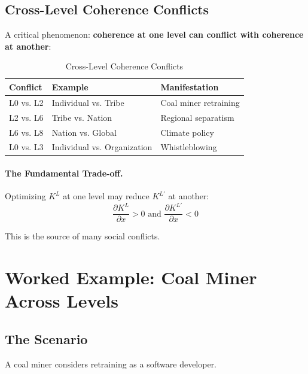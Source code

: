 \subsection{Cross-Level Coherence Conflicts}

A critical phenomenon: \textbf{coherence at one level can conflict with coherence at another}:

\begin{table}[htbp]
\centering
\caption{Cross-Level Coherence Conflicts}
\label{tab:aaa-conflicts}
\renewcommand{\arraystretch}{1.3}
\begin{tabular}{@{}lll@{}}
\toprule
\textbf{Conflict} & \textbf{Example} & \textbf{Manifestation} \\
\midrule
L0 vs. L2 & Individual vs. Tribe & Coal miner retraining \\
L2 vs. L6 & Tribe vs. Nation & Regional separatism \\
L6 vs. L8 & Nation vs. Global & Climate policy \\
L0 vs. L3 & Individual vs. Organization & Whistleblowing \\
\bottomrule
\end{tabular}
\end{table}

\paragraph{The Fundamental Trade-off.}
Optimizing $K^L$ at one level may reduce $K^{L'}$ at another:
\begin{equation}
\frac{\partial K^L}{\partial x} > 0 \text{ and } \frac{\partial K^{L'}}{\partial x} < 0
\end{equation}

This is the source of many social conflicts.

\section{Worked Example: Coal Miner Across Levels}
\label{sec:aaa-coal-miner}

\subsection{The Scenario}

A coal miner considers retraining as a software developer.

